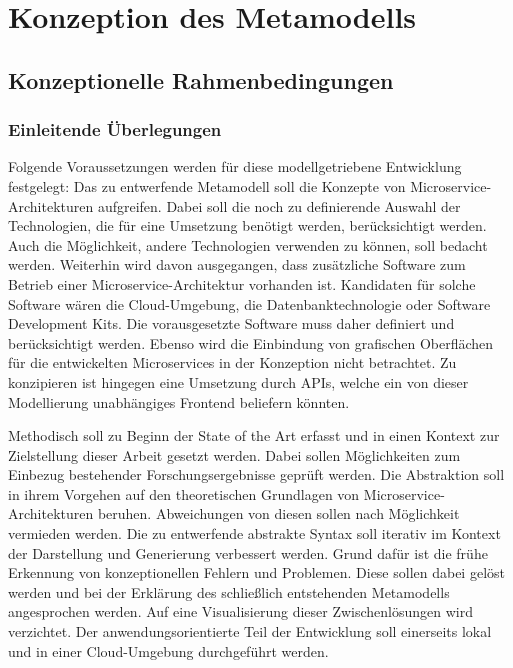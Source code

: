 \chapter{Konzeption des Metamodells}

\section{Konzeptionelle Rahmenbedingungen}

\subsection{Einleitende Überlegungen}

Folgende Voraussetzungen werden für diese modellgetriebene Entwicklung festgelegt: Das zu entwerfende Metamodell soll die Konzepte von Microservice-Architekturen aufgreifen. Dabei soll die noch zu definierende Auswahl der Technologien, die für eine Umsetzung benötigt werden, berücksichtigt werden. Auch die Möglichkeit, andere Technologien verwenden zu können, soll bedacht werden. Weiterhin wird davon ausgegangen, dass zusätzliche Software zum Betrieb einer Microservice-Architektur vorhanden ist. Kandidaten für solche Software wären die Cloud-Umgebung, die Datenbanktechnologie oder Software Development Kits. Die vorausgesetzte Software muss daher definiert und berücksichtigt werden. Ebenso wird die Einbindung von grafischen Oberflächen für die entwickelten Microservices in der Konzeption nicht betrachtet. Zu konzipieren ist hingegen eine Umsetzung durch APIs, welche ein von dieser Modellierung unabhängiges Frontend beliefern könnten.

Methodisch soll zu Beginn der State of the Art erfasst und in einen Kontext zur Zielstellung dieser Arbeit gesetzt werden. Dabei sollen Möglichkeiten zum Einbezug bestehender Forschungsergebnisse geprüft werden. Die Abstraktion soll in ihrem Vorgehen auf den theoretischen Grundlagen von Microservice-Architekturen beruhen. Abweichungen von diesen sollen nach Möglichkeit vermieden werden. Die zu entwerfende abstrakte Syntax soll iterativ im Kontext der Darstellung und Generierung verbessert werden. Grund dafür ist die frühe Erkennung von konzeptionellen Fehlern und Problemen. Diese sollen dabei gelöst werden und bei der Erklärung des schließlich entstehenden Metamodells angesprochen werden. Auf eine Visualisierung dieser Zwischenlösungen wird verzichtet. Der anwendungsorientierte Teil der Entwicklung soll einerseits lokal und in einer Cloud-Umgebung durchgeführt werden.

